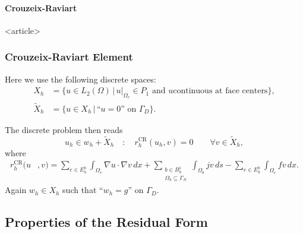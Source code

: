 \paragraph{Crouzeix-Raviart}

\begin{frame}<article>
\frametitle<presentation>{Crouzeix-Raviart Element}
Here we use the following discrete spaces:
\begin{align*}
X_h &= \{u\in L_2(\Omega) \,|\, u|_{\Omega_e}\in P_1 \text{ and $u$
continuous at face centers}\},\\
\tilde{X}_h &= \{u\in X_h \,|\, \text{``$u=0$'' on $\Gamma_D$}\}.
\end{align*}

The discrete problem then reads
\begin{equation*}
u_h \in w_h+\tilde{X}_h \quad : \quad r_h^\text{CR}(u_h,v) = 0 \qquad \forall v\in \tilde{X}_h,
\end{equation*}
where
\begin{equation*}
\begin{split}
r_h^\text{CR}(u &,v) = \sum_{e\in E_h^0} \int_{\Omega_e} \nabla u\cdot \nabla v \, dx
+ \sum_{\substack{b\in
B^1_h\\\Omega_b\subseteq\Gamma_N}} \int_{\Omega_b} j v \,ds  - \sum_{e\in E_h^0} \int_{\Omega_e} fv \, dx .
\end{split}
\end{equation*}
Again $w_h\in X_h$ such that ``$w_h=g$'' on $\Gamma_D$.
\end{frame}


\subsection{Properties of the Residual Form}

